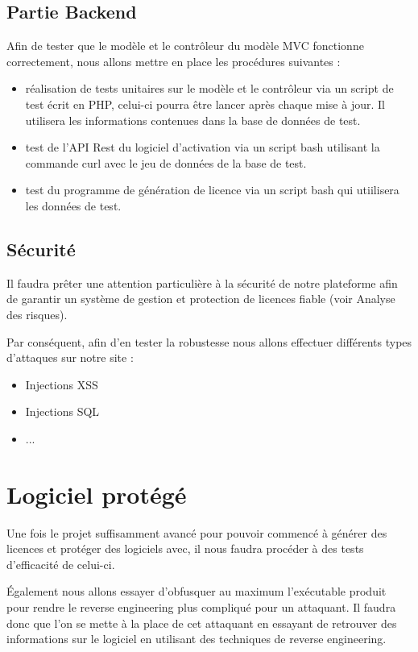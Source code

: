\subsection{Partie Backend}

Afin de tester que le modèle et le contrôleur du modèle MVC fonctionne correctement, 
nous allons mettre en place les procédures suivantes :
\begin{itemize}
    \item réalisation de tests unitaires sur le modèle et le contrôleur via 
          un script de test écrit en PHP, celui-ci pourra être lancer après 
          chaque mise à jour. Il utilisera les informations contenues dans la  
          base de données de test.
        
    \item test de l'API Rest du logiciel d'activation via un script bash 
          utilisant la commande curl avec le jeu de données de la base de test.
        
    \item test du programme de génération de licence via un script bash qui
          utiilisera les données de test.
\end{itemize}

\subsection{Sécurité}
Il faudra prêter une attention particulière à la sécurité de notre plateforme afin de garantir un système
de gestion et protection de licences fiable (voir Analyse des risques).

Par conséquent, afin d'en tester la robustesse nous allons effectuer différents types d'attaques sur notre site :
\begin{itemize}
    \item Injections XSS
    \item Injections SQL
    \item ...
\end{itemize}

\section{Logiciel protégé}

Une fois le projet suffisamment avancé pour pouvoir commencé à générer des licences et protéger des logiciels
avec, il nous faudra procéder à des tests d'efficacité de celui-ci.

Également nous allons essayer d'obfusquer au maximum l'exécutable produit pour rendre le reverse engineering
plus compliqué pour un attaquant. Il faudra donc que l'on se mette à la place de cet attaquant en essayant
de retrouver des informations sur le logiciel en utilisant des techniques de reverse engineering.


